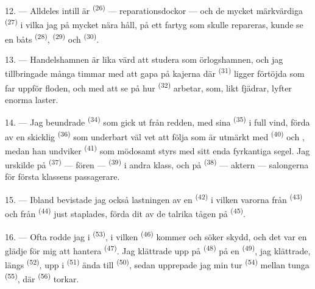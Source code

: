 12. --- Alldeles intill är  \textsuperscript{(26)} --- reparationsdockor ---
och de mycket märkvärdiga  \textsuperscript{(27)} i vilka jag på mycket
nära håll, på ett fartyg som skulle repareras, kunde se en båts 
\textsuperscript{(28)},
 \textsuperscript{(29)} och  \textsuperscript{(30)}.

13. --- Handelshamnen är lika värd att studera som örlogshamnen, och jag tillbringade många
timmar med att gapa på kajerna där  \textsuperscript{(31)} ligger förtöjda
som far uppför floden, och med att se på hur  \textsuperscript{(32)}
arbetar, som, likt fjädrar, lyfter enorma laster.

\VUsaut{4.0mm}
\VUsaut{3.0mm}

14. --- Jag beundrade  \textsuperscript{(34)} som gick ut från redden,
med sina  \textsuperscript{(35)} i full vind, förda av en skicklig
 \textsuperscript{(36)} som underbart väl vet att följa 
som är utmärkt med  \textsuperscript{(40)} och , medan han
undviker
 \textsuperscript{(41)} som mödosamt styrs med sitt enda
fyrkantiga segel. Jag urskilde på  \textsuperscript{(37)} --- fören ---
 \textsuperscript{(39)} i andra klass, och på
 \textsuperscript{(38)} --- aktern --- salongerna för
första klassens passagerare.

15. --- Ibland bevistade jag också lastningen av en  \textsuperscript{(42)} i
vilken varorna från  \textsuperscript{(43)} och från 
\textsuperscript{(44)} just staplades, förda dit av de talrika tågen på 
\textsuperscript{(45)}.

\VUsaut{3.0mm}
\VUsaut{3.0mm}

16. --- Ofta rodde jag i  \textsuperscript{(53)}, i vilken
 \textsuperscript{(46)} kommer och söker skydd, och det var en
glädje för mig att hantera  \textsuperscript{(47)}. Jag klättrade upp på
 \textsuperscript{(48)} på en  \textsuperscript{(49)}, jag
klättrade, längs  \textsuperscript{(52)}, upp i 
\textsuperscript{(51)} ända till
 \textsuperscript{(50)}, sedan upprepade jag min tur  \textsuperscript{(54)} mellan tunga  \textsuperscript{(55)}, där
 \textsuperscript{(56)} torkar.

